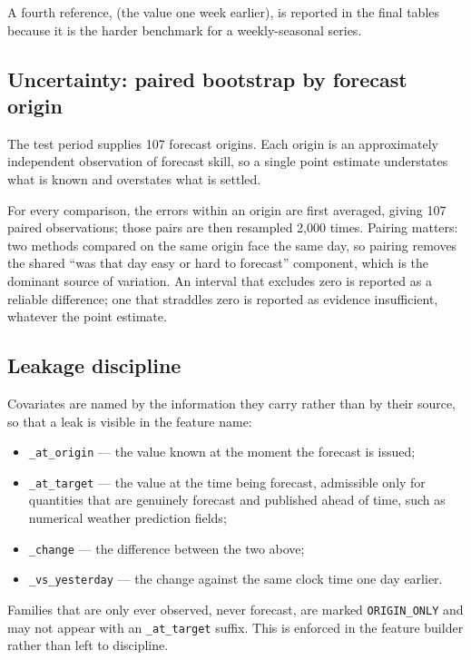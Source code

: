 A fourth reference, \naiveB{} (the value one week earlier), is reported in the final
tables because it is the harder benchmark for a weekly-seasonal series.

\subsection{Uncertainty: paired bootstrap by forecast origin}
\label{sec:bootstrap}

The test period supplies 107 forecast origins. Each origin is an approximately independent
observation of forecast skill, so a single point estimate understates what is known and
overstates what is settled.

For every comparison, the errors within an origin are first averaged, giving 107 paired
observations; those pairs are then resampled 2,000 times. Pairing matters: two methods
compared on the same origin face the same day, so pairing removes the shared
``was that day easy or hard to forecast'' component, which is the dominant source of
variation. An interval that excludes zero is reported as a reliable difference; one that
straddles zero is reported as evidence insufficient, whatever the point estimate.

\subsection{Leakage discipline}

Covariates are named by the information they carry rather than by their source, so that a
leak is visible in the feature name:

\begin{itemize}
\item \verb+_at_origin+ --- the value known at the moment the forecast is issued;
\item \verb+_at_target+ --- the value at the time being forecast, admissible only for
quantities that are genuinely forecast and published ahead of time, such as numerical
weather prediction fields;
\item \verb+_change+ --- the difference between the two above;
\item \verb+_vs_yesterday+ --- the change against the same clock time one day earlier.
\end{itemize}

Families that are only ever observed, never forecast, are marked \verb+ORIGIN_ONLY+ and
may not appear with an \verb+_at_target+ suffix. This is enforced in the feature builder
rather than left to discipline.

